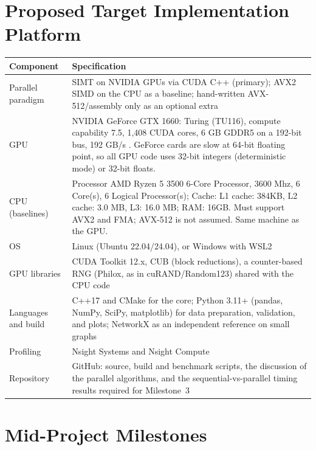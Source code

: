 \section{Proposed Target Implementation Platform}
\label{sec:platform}

\begin{center}
\small
\begin{tabularx}{\linewidth}{@{}lX@{}}
\toprule
Component & Specification \\
\midrule
Parallel paradigm & SIMT on NVIDIA GPUs via CUDA C++ (primary); AVX2 SIMD on the CPU as a baseline; hand-written AVX-512/assembly only as an optional extra \\
GPU & NVIDIA GeForce GTX 1660: Turing (TU116), compute capability 7.5, 1{,}408 CUDA cores, 6 GB GDDR5 on a 192-bit bus, 192 GB/s \cite{gtx1660_specs}. GeForce cards are slow at 64-bit floating point, so all GPU code uses 32-bit integers (deterministic mode) or 32-bit floats. \\
CPU (baselines) & Processor	AMD Ryzen 5 3500 6-Core Processor, 3600 Mhz, 6 Core(s), 6 Logical Processor(s); Cache: L1 cache: 384KB, L2 cache: 3.0 MB, L3: 16.0 MB; RAM: 16GB. Must support AVX2 and FMA; AVX-512 is not assumed. Same machine as the GPU. \\
OS & Linux (Ubuntu 22.04/24.04), or Windows with WSL2 \\
GPU libraries & CUDA Toolkit 12.x, CUB (block reductions), a counter-based RNG (Philox, as in cuRAND/Random123) shared with the CPU code\\ %
Languages and build & C++17 and CMake for the core; Python 3.11+ (pandas, NumPy, SciPy, matplotlib) for data preparation, validation, and plots; NetworkX as an independent reference on small graphs \\
Profiling & Nsight Systems and Nsight Compute \\
Repository & GitHub: source, build and benchmark scripts, the discussion of the parallel algorithms, and the sequential-vs-parallel timing results required for Milestone~3 \\
\bottomrule
\end{tabularx}
\end{center}

\section{Mid-Project Milestones}
\label{sec:milestones}

